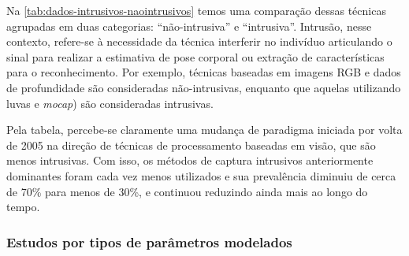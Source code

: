 


Na \autoref{tab:dados-intrusivos-naointrusivos} temos uma comparação dessas técnicas agrupadas em duas categorias: ``não-intrusiva'' e ``intrusiva''. Intrusão, nesse contexto, refere-se à necessidade da técnica interferir no indivíduo articulando o sinal para realizar a estimativa de pose corporal ou extração de características para o reconhecimento. Por exemplo, técnicas baseadas em imagens RGB e dados de profundidade são consideradas não-intrusivas, enquanto que aquelas utilizando luvas e \textit{mocap}) são consideradas intrusivas. 

Pela tabela, percebe-se claramente uma mudança de paradigma iniciada por volta de 2005 na direção de técnicas de processamento baseadas em visão, que são menos intrusivas. Com isso, os métodos de captura intrusivos anteriormente dominantes foram cada vez menos utilizados e sua prevalência diminuiu de cerca de 70\% para menos de 30\%, e continuou reduzindo ainda mais ao longo do tempo.




\subsubsection{Estudos por tipos de parâmetros modelados}
\label{slr-parametros-modelados}

